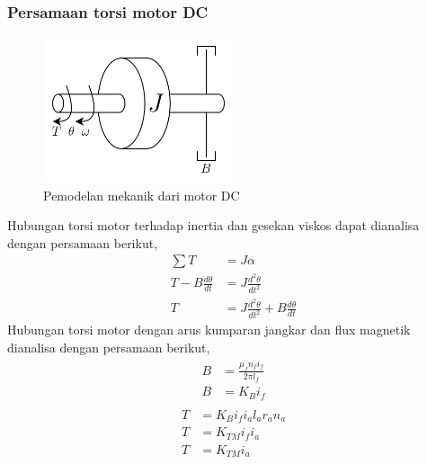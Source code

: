 \documentclass[../cover.tex]{subfiles}
\begin{document}
        \subsubsection{Persamaan torsi motor DC}
            \begin{figure}[H]
                \centering
                \includegraphics[width = 0.5\textwidth]{assets/image/pemodelan_mekanik_motor.png}
                \caption{Pemodelan mekanik dari motor DC}
                \label{gambar_5}
            \end{figure}
            Hubungan torsi motor terhadap inertia dan gesekan viskos dapat dianalisa dengan persamaan berikut,
            \begin{equation}
                \begin{split}
                    \sum T &= J\alpha \\[5pt]
                    T - B\frac{d\theta}{dt} &= J\frac{d^2\theta}{dt^2} \\[5pt]
                    T &= J\frac{d^2\theta}{dt^2} + B\frac{d\theta}{dt}
                    \label{persamaan_13}
                \end{split}
            \end{equation}
            Hubungan torsi motor dengan arus kumparan jangkar dan flux magnetik dianalisa dengan persamaan berikut,
            \begin{equation}
                \begin{split}
                    B &= \frac{\mu_f n_f i_f}{2\pi l_f} \\[5pt]
                    B &= K_B i_f \\[5pt]
                    \label{persamaan_14}
                \end{split}
            \end{equation}
            \begin{equation}
                \begin{split}
                    T &= K_B i_f i_a l_a r_a n_a \\[5pt]
                    T &= K_{TM} i_f i_a \\[5pt]
                    T &= K_{TM} i_a
                    \label{persamaan_15}
                \end{split}
            \end{equation}
\end{document}
